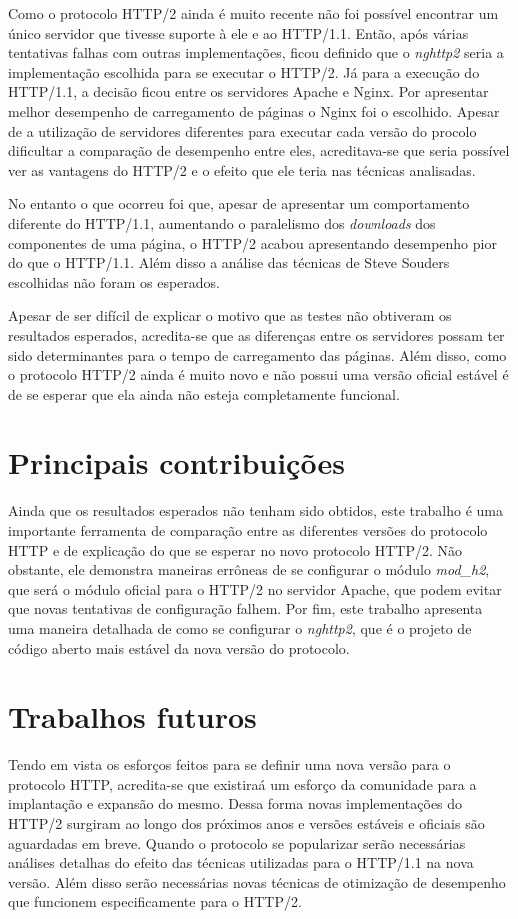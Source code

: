Como o protocolo HTTP/2 ainda é muito recente não foi possível encontrar um único servidor que tivesse suporte à ele e ao HTTP/1.1. Então, após várias tentativas falhas com outras implementações, ficou definido que o \textit{nghttp2} seria a implementação escolhida para se executar o HTTP/2. Já para a execução do HTTP/1.1, a decisão ficou entre os servidores Apache e Nginx. Por apresentar melhor desempenho de carregamento de páginas o Nginx foi o escolhido. Apesar de a utilização de servidores diferentes para executar cada versão do procolo dificultar a comparação de desempenho entre eles, acreditava-se que seria possível ver as vantagens do HTTP/2 e o efeito que ele teria nas técnicas analisadas.

No entanto o que ocorreu foi que, apesar de apresentar um comportamento diferente do HTTP/1.1, aumentando o paralelismo dos \textit{downloads} dos componentes de uma página, o HTTP/2 acabou apresentando desempenho pior do que o HTTP/1.1. Além disso a análise das técnicas de Steve Souders escolhidas não foram os esperados.

Apesar de ser difícil de explicar o motivo que as testes não obtiveram os resultados esperados, acredita-se que as diferenças entre os servidores possam ter sido determinantes para o tempo de carregamento das páginas. Além disso, como o protocolo HTTP/2 ainda é muito novo e não possui uma versão oficial estável é de se esperar que ela ainda não esteja completamente funcional.

\section{Principais contribuições}
\label{principaiscontribuicoes}

Ainda que os resultados esperados não tenham sido obtidos, este trabalho é uma importante ferramenta de comparação entre as diferentes versões do protocolo HTTP e de explicação do que se esperar no novo protocolo HTTP/2. Não obstante, ele demonstra maneiras errôneas de se configurar o módulo \textit{mod\_h2}, que será o módulo oficial para o HTTP/2 no servidor Apache, que podem evitar que novas tentativas de configuração falhem. Por fim, este trabalho apresenta uma maneira detalhada de como se configurar o \textit{nghttp2}, que é o projeto de código aberto mais estável da nova versão do protocolo.

\section{Trabalhos futuros}
\label{trabalhosfuturos}

Tendo em vista os esforços feitos para se definir uma nova versão para o protocolo HTTP, acredita-se que existiraá um esforço da comunidade para a implantação e expansão do mesmo. Dessa forma novas implementações do HTTP/2 surgiram ao longo dos próximos anos e versões estáveis e oficiais são aguardadas em breve. Quando o protocolo se popularizar serão necessárias análises detalhas do efeito das técnicas utilizadas para o HTTP/1.1 na nova versão. Além disso serão necessárias novas técnicas de otimização de desempenho que funcionem especificamente para o HTTP/2.
